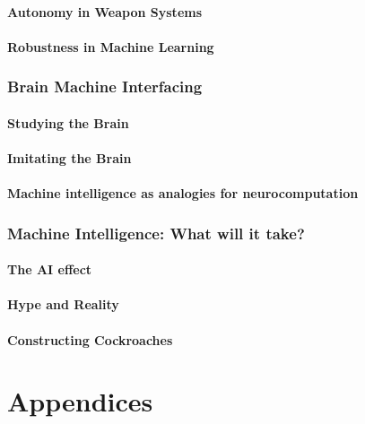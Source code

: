 \documentclass[10pt]{article}
\begin{document}
\subsection{Autonomy in Weapon Systems}

\subsection{Robustness in Machine Learning}


\section{Brain Machine Interfacing}

\subsection{Studying the Brain}

\subsection{Imitating the Brain}

\subsection{Machine intelligence as analogies for neurocomputation}

\section{Machine Intelligence: What will it take?}

\subsection{The AI effect}

\subsection{Hype and Reality}

\subsection{Constructing Cockroaches}


\part{Appendices}
\end{document}
